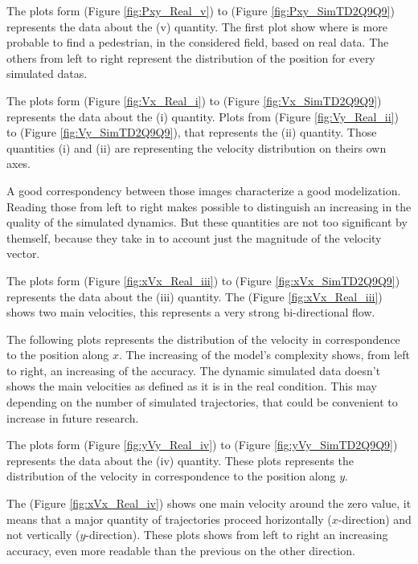 \documentclass[class=article, crop=false]{standalone}
\begin{document}
The plots form (Figure \ref{fig:Pxy_Real_v}) to (Figure \ref{fig:Pxy_SimTD2Q9Q9}) represents the data about the (v) quantity.
The first plot show where is more probable to find a pedestrian, in the considered field, based on real data.
The others from left to right represent the distribution of the position for every simulated datas.







The plots form (Figure \ref{fig:Vx_Real_i}) to (Figure \ref{fig:Vx_SimTD2Q9Q9}) represents the data about the (i) quantity.
Plots from (Figure \ref{fig:Vy_Real_ii}) to (Figure \ref{fig:Vy_SimTD2Q9Q9}), that represents the (ii) quantity.
Those quantities (i) and (ii) are representing the velocity distribution on theirs own axes.

A good correspondency between those images characterize a good modelization.
Reading those from left to right makes possible to distinguish an increasing in the quality of the simulated dynamics.
But these quantities are not too significant by themself, because they take in to account just the magnitude of the velocity vector.

The plots form (Figure \ref{fig:xVx_Real_iii}) to (Figure \ref{fig:xVx_SimTD2Q9Q9}) represents the data about the (iii) quantity.
The (Figure \ref{fig:xVx_Real_iii}) shows two main velocities, this represents a very strong bi-directional flow.

The following plots represents the distribution of the velocity in correspondence to the position along $x$.
The increasing of the model's complexity shows, from left to right, an increasing of the accuracy.
The dynamic simulated data doesn't shows the main velocities as defined as it is in the real condition.
This may depending on the number of simulated trajectories, that could be convenient to increase in future research.

The plots form (Figure \ref{fig:yVy_Real_iv}) to (Figure \ref{fig:yVy_SimTD2Q9Q9}) represents the data about the (iv) quantity.
These plots represents the distribution of the velocity in correspondence to the position along $y$.

The (Figure \ref{fig:xVx_Real_iv}) shows one main velocity around the zero value, it means that a major quantity of trajectories proceed horizontally ($x$-direction) and not vertically ($y$-direction).
These plots shows from left to right an increasing accuracy, even more readable than the previous on the other direction.
\end{document}
